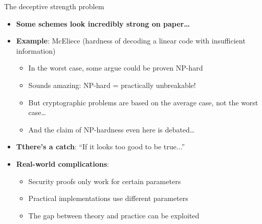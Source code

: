 \documentclass[aspectratio=169, lualatex, handout]{beamer}
\begin{document}
\begin{frame}{The deceptive strength problem}
	\begin{itemize}
		\item \textbf{Some schemes look incredibly strong on paper\ldots}
		\item \textbf{Example}: McEliece (hardness of decoding a linear code with insufficient information)
		      \begin{itemize}
			      \item In the worst case, some argue could be proven NP-hard
			      \item Sounds amazing: NP-hard = practically unbreakable!
			      \item But cryptographic problems are based on the average case, not the worst case\ldots
			      \item And the claim of NP-hardness even here is debated\ldots
		      \end{itemize}
		\item \textbf{Tthere's a catch}: ``If it looks too good to be true...''
		\item \textbf{Real-world complications}:
		      \begin{itemize}
			      \item Security proofs only work for certain parameters
			      \item Practical implementations use different parameters
			      \item The gap between theory and practice can be exploited
		      \end{itemize}
	\end{itemize}
\end{frame}
\end{document}
